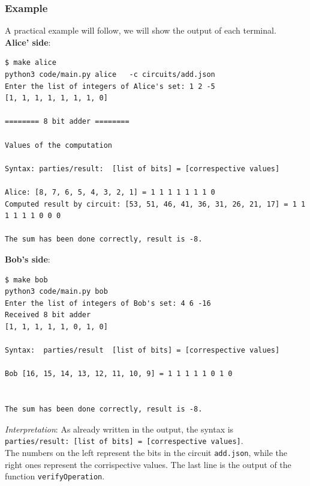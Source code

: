 \documentclass[12pt]{article}
\newcommand{\inlinecode}{\texttt}
\begin{document}
\subsubsection{Example}
A practical example will follow, we will show the output of each terminal.\\
\textbf{Alice' side}:
\begin{lstlisting}[frame=single, basicstyle=\scriptsize]
$ make alice
python3 code/main.py alice   -c circuits/add.json
Enter the list of integers of Alice's set: 1 2 -5
[1, 1, 1, 1, 1, 1, 1, 0]

======== 8 bit adder ========

Values of the computation

Syntax: parties/result:  [list of bits] = [correspective values]

Alice: [8, 7, 6, 5, 4, 3, 2, 1] = 1 1 1 1 1 1 1 0
Computed result by circuit: [53, 51, 46, 41, 36, 31, 26, 21, 17] = 1 1 1 1 1 1 0 0 0

The sum has been done correctly, result is -8.
\end{lstlisting}
\textbf{Bob's side}:
\begin{lstlisting}[frame=single, basicstyle=\scriptsize]
$ make bob
python3 code/main.py bob
Enter the list of integers of Bob's set: 4 6 -16
Received 8 bit adder
[1, 1, 1, 1, 1, 0, 1, 0]

Syntax:  parties/result  [list of bits] = [correspective values]

Bob [16, 15, 14, 13, 12, 11, 10, 9] = 1 1 1 1 1 0 1 0


The sum has been done correctly, result is -8.
\end{lstlisting}
\textit{Interpretation}: As already written in the output, the syntax is\\ \inlinecode{parties/result:  [list of bits] =   [correspective values]}. \vspace{2mm} \\
The numbers on the left represent the bits in the circuit \inlinecode{add.json}, while the right ones represent the corrispective values. The last line is the output of the function \inlinecode{verifyOperation}.



\end{document}
